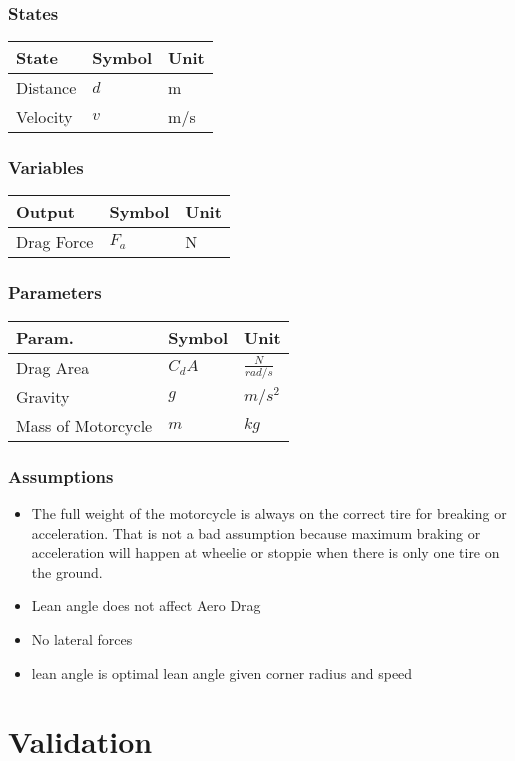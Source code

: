 \documentclass[../SimBALink.tex]{subfiles}
\begin{document}
\subsubsection{States}
	\begin{tabular}{ l | l | l  }
		State					&	Symbol		&	Unit		\\	\hline
		Distance				&	$d$			& 	m \\
		Velocity 				&	$v$			&	m/s \\
	\end{tabular}
\subsubsection{Variables}
	\begin{tabular}{ l | l | l  }
		Output					&	Symbol		&	Unit		\\	\hline
		Drag Force				&	$F_a$		&  N
						
	\end{tabular}
\subsubsection{Parameters}
	\begin{tabular}{ l | l | l  }
		Param.					&	Symbol		&	Unit		\\	\hline
		Drag Area				&	$C_dA$		&	 $\frac{N}{rad/s}$ \\		
		Gravity 				&	$g$			&	$m/s^2$ \\
		Mass of Motorcycle		&	$m$			&  $kg$				
	\end{tabular}

\subsubsection{Assumptions}
\begin{itemize}
    \item The full weight of the motorcycle is always on the correct tire for breaking or acceleration. That is not a bad assumption because maximum braking or acceleration will happen at wheelie or stoppie when there is only one tire on the ground.
    \item Lean angle does not affect Aero Drag
    \item No lateral forces
    \item lean angle is optimal lean angle given corner radius and speed
\end{itemize}

\section{Validation}
\end{document}
